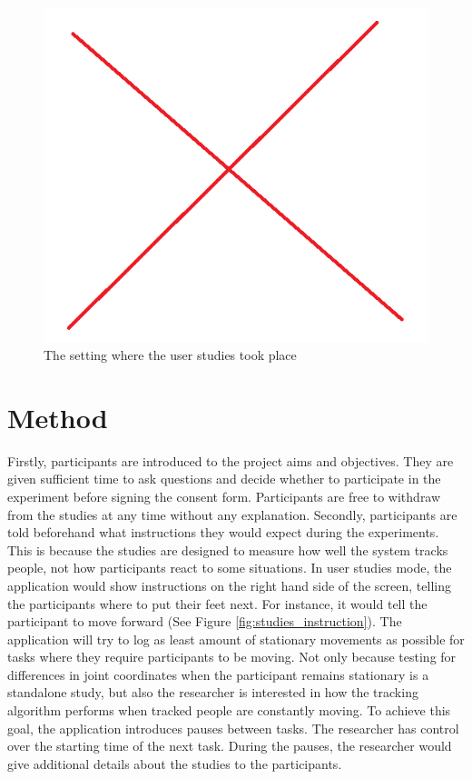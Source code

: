 \begin{figure}[!h]
  \centering
  \includegraphics[width=0.8\linewidth]{figs/studies_setting}
  \caption{The setting where the user studies took place}
  \label{fig:studies_setting}
\end{figure}

\section{Method}
\label{sec:studies_method}

Firstly, participants are introduced to the project aims and objectives. They are given sufficient time to ask questions and decide whether to participate in the experiment before signing the consent form. Participants are free to withdraw from the studies at any time without any explanation. Secondly, participants are told beforehand what instructions they would expect during the experiments. This is because the studies are designed to measure how well the system tracks people, not how participants react to some situations. In user studies mode, the application would show instructions on the right hand side of the screen, telling the participants where to put their feet next. For instance, it would tell the participant to move forward (See Figure \ref{fig:studies_instruction}). The application will try to log as least amount of stationary movements as possible for tasks where they require participants to be moving. Not only because testing for differences in joint coordinates when the participant remains stationary is a standalone study, but also the researcher is interested in how the tracking algorithm performs when tracked people are constantly moving. To achieve this goal, the application introduces pauses between tasks. The researcher has control over the starting time of the next task. During the pauses, the researcher would give additional details about the studies to the participants.

